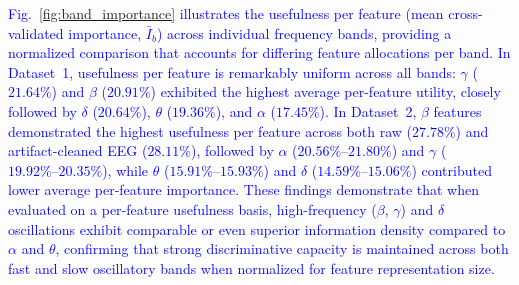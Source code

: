 \documentclass[conference]{IEEEtran}
\begin{document}
\textcolor{blue}{Fig.~\ref{fig:band_importance} illustrates the usefulness per feature (mean cross-validated importance, $\bar{I}_b$) across individual frequency bands, providing a normalized comparison that accounts for differing feature allocations per band. In Dataset~1, usefulness per feature is remarkably uniform across all bands: $\gamma$ ($21.64\%$) and $\beta$ ($20.91\%$) exhibited the highest average per-feature utility, closely followed by $\delta$ ($20.64\%$), $\theta$ ($19.36\%$), and $\alpha$ ($17.45\%$). In Dataset~2, $\beta$ features demonstrated the highest usefulness per feature across both raw ($27.78\%$) and artifact-cleaned EEG ($28.11\%$), followed by $\alpha$ ($20.56\%\text{--}21.80\%$) and $\gamma$ ($19.92\%\text{--}20.35\%$), while $\theta$ ($15.91\%\text{--}15.93\%$) and $\delta$ ($14.59\%\text{--}15.06\%$) contributed lower average per-feature importance. These findings demonstrate that when evaluated on a per-feature usefulness basis, high-frequency ($\beta$, $\gamma$) and $\delta$ oscillations exhibit comparable or even superior information density compared to $\alpha$ and $\theta$, confirming that strong discriminative capacity is maintained across both fast and slow oscillatory bands when normalized for feature representation size.}
\end{document}
